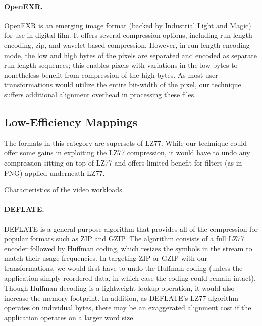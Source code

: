 \paragraph{OpenEXR.}
OpenEXR is an emerging image format (backed by Industrial Light and
Magic) for use in digital film.  It offers several compression
options, including run-length encoding, zip, and wavelet-based
compression.  However, in run-length encoding mode, the low and high
bytes of the pixels are separated and encoded as separate run-length
sequences; this enables pixels with variations in the low bytes to
nonetheless benefit from compression of the high bytes.  As most user
transformations would utilize the entire bit-width of the pixel, our
technique suffers additional alignment overhead in processing these
files.

\subsection{Low-Efficiency Mappings}
\label{sec:formats-bad}

The formats in this category are supersets of LZ77.  While our
technique could offer some gains in exploiting the LZ77 compression,
it would have to undo any compression sitting on top of LZ77 and
offers limited benefit for filters (as in PNG) applied underneath
LZ77.

\begin{table*}[t]
\vspace{-1\baselineskip}
\caption{Characteristics of the video workloads.
\protect\label{tab:videos}}
\end{table*}

\paragraph{DEFLATE.}
DEFLATE is a general-purpose algorithm that provides all of the
compression for popular formats such as ZIP and GZIP.  The algorithm
consists of a full LZ77 encoder followed by Huffman coding, which
resizes the symbols in the stream to match their usage frequencies.
In targeting ZIP or GZIP with our transformations, we would first
have to undo the Huffman coding (unless the application simply
reordered data, in which case the coding could remain intact).  Though
Huffman decoding is a lightweight lookup operation, it would also
increase the memory footprint.  In addition, as DEFLATE's LZ77
algorithm operates on individual bytes, there may be an exaggerated
alignment cost if the application operates on a larger word size.


